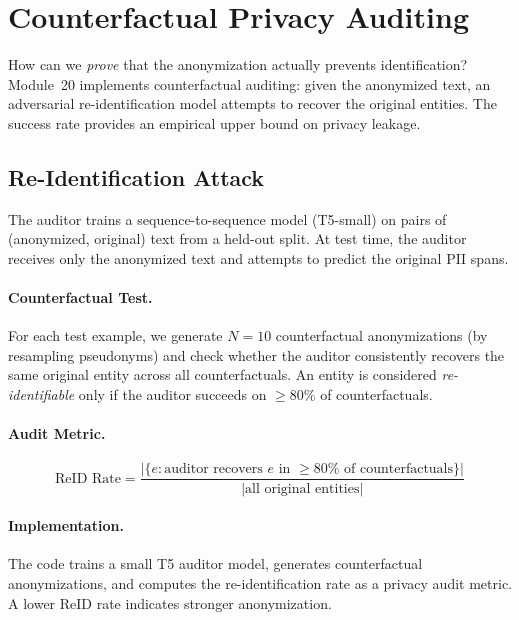 \documentclass[11pt, a4paper]{article}
\begin{document}
\section{Counterfactual Privacy Auditing}
\label{sec:counterfactual}

How can we \emph{prove} that the anonymization actually prevents identification?  Module~20 implements counterfactual auditing: given the anonymized text, an adversarial re-identification model attempts to recover the original entities.  The success rate provides an empirical upper bound on privacy leakage.

\subsection{Re-Identification Attack}

The auditor trains a sequence-to-sequence model (T5-small) on pairs of (anonymized, original) text from a held-out split.  At test time, the auditor receives only the anonymized text and attempts to predict the original PII spans.

\paragraph{Counterfactual Test.}
For each test example, we generate $N{=}10$ counterfactual anonymizations (by resampling pseudonyms) and check whether the auditor consistently recovers the same original entity across all counterfactuals.  An entity is considered \emph{re-identifiable} only if the auditor succeeds on $\geq 80\%$ of counterfactuals.

\paragraph{Audit Metric.}
\[
  \text{ReID Rate} = \frac{|\{e : \text{auditor recovers } e \text{ in } \geq 80\% \text{ of counterfactuals}\}|}{|\text{all original entities}|}
\]

\paragraph{Implementation.}
The code trains a small T5 auditor model, generates counterfactual anonymizations, and computes the re-identification rate as a privacy audit metric.  A lower ReID rate indicates stronger anonymization.


\end{document}
